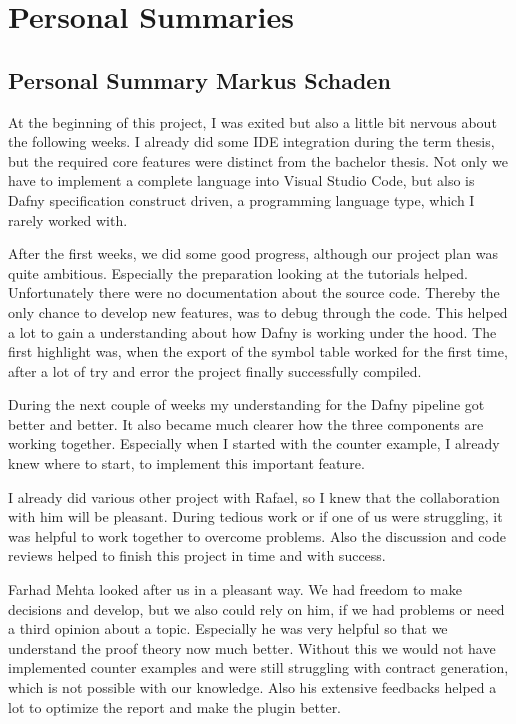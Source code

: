 \section{Personal Summaries}

\subsection{Personal Summary Markus Schaden}
At the beginning of this project, I was exited but also a little bit nervous about the following weeks. I already did some IDE integration during the term thesis, but the required core features were distinct from the bachelor thesis. Not only we have to implement a complete language into Visual Studio Code, but also is Dafny specification construct driven, a programming language type, which I rarely worked with.

After the first weeks, we did some good progress, although our project plan was quite ambitious. Especially the preparation looking at the tutorials helped. Unfortunately there were no documentation about the source code. Thereby the only chance to develop new features, was to debug through the code. This helped a lot to gain a understanding about how Dafny is working under the hood. The first highlight was, when the export of the symbol table worked for the first time, after a lot of try and error the project finally successfully compiled. 

During the next couple of weeks my understanding for the Dafny pipeline got better and better. It also became much clearer how the three components are working together. Especially when I started with the counter example, I already knew where to start, to implement this important feature. 

I already did various other project with Rafael, so I knew that the collaboration with him will be pleasant. During tedious work or if one of us were struggling, it was helpful to work together to overcome problems. Also the discussion and code reviews helped to finish this project in time and with success.  

Farhad Mehta looked after us in a pleasant way. We had freedom to make decisions and develop, but we also could rely on him, if we had problems or need a third opinion about a topic. Especially he was very helpful so that we understand the proof theory now much better. Without this we would not have implemented counter examples and were still struggling with contract generation, which is not possible with our knowledge. Also his extensive feedbacks helped a lot to optimize the report and make the plugin better. 

